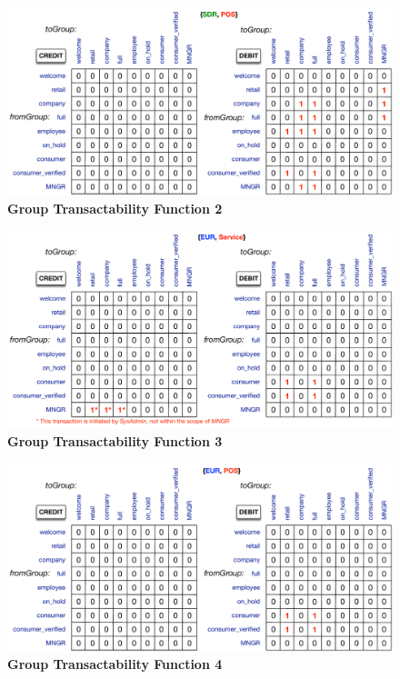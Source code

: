 \begin{figure}[H]
\centering
\includegraphics[width=16cm]{Figures/GTF2}
\caption{\small\textbf{Group Transactability Function 2}}
\label{fig:GTF2}
\end{figure}
\newpage

\begin{figure}[H]
\centering
\includegraphics[width=16cm]{Figures/GTF3}
\caption{\small\textbf{Group Transactability Function 3}}
\label{fig:GTF3}
\end{figure}

\begin{figure}[H]
\centering
\includegraphics[width=16cm]{Figures/GTF4}
\caption{\small\textbf{Group Transactability Function 4}}
\label{fig:GTF4}
\end{figure}




